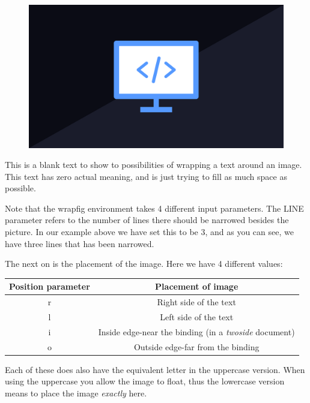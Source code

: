 \begin{figure}
    \centering
    \includegraphics[width=0.9\linewidth]{Images/Programming.png}
    \label{fig:image_wrap}
\end{figure} %

This is a blank text to show to possibilities of wrapping a text around an image. This text has zero actual meaning, and is just trying to fill 
as much space as possible. 


\vspace{4\baselineskip}
Note that the wrapfig environment takes 4 different input parameters. The LINE parameter refers to the number of lines there should be narrowed besides the picture. 
In our example above we have set this to be 3, and as you can see, we have three lines that has been narrowed.

The next on is the placement of the image. Here we have 4 different values: \\

\begin{table}[h]
    \centering
    \begin{tabular}{|c|c|} \hline
        \rowcolor{gray!30}
        Position parameter & Placement of image \\ \hline
        r & Right side of the text \\ \hline
        l & Left side of the text \\ \hline 
        i & Inside edge-near the binding (in a \textit{twoside} document) \\ \hline
        o & Outside edge-far from the binding \\ \hline
    \end{tabular}
\end{table} %
Each of these  does also have the equivalent letter in the uppercase version. When using the uppercase you allow the image to float, thus the lowercase version
means to place the image \textit{exactly} here.

